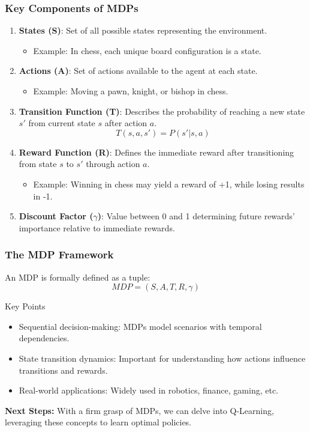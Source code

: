 \documentclass[aspectratio=169]{beamer}
\begin{document}
\begin{frame}[fragile]
    \frametitle{Key Components of MDPs}
    \begin{enumerate}
        \item \textbf{States (S)}: Set of all possible states representing the environment.
            \begin{itemize}
                \item Example: In chess, each unique board configuration is a state.
            \end{itemize}
        \item \textbf{Actions (A)}: Set of actions available to the agent at each state.
            \begin{itemize}
                \item Example: Moving a pawn, knight, or bishop in chess.
            \end{itemize}
        \item \textbf{Transition Function (T)}: Describes the probability of reaching a new state $s'$ from current state $s$ after action $a$.
            \begin{equation}
            T(s, a, s') = P(s' | s, a)
            \end{equation}
        \item \textbf{Reward Function (R)}: Defines the immediate reward after transitioning from state $s$ to $s'$ through action $a$.
            \begin{itemize}
                \item Example: Winning in chess may yield a reward of +1, while losing results in -1.
            \end{itemize}
        \item \textbf{Discount Factor ($\gamma$)}: Value between 0 and 1 determining future rewards' importance relative to immediate rewards.
    \end{enumerate}
\end{frame}

\begin{frame}[fragile]
    \frametitle{The MDP Framework}
    An MDP is formally defined as a tuple:
    \begin{equation}
    MDP = (S, A, T, R, \gamma)
    \end{equation}
    \begin{block}{Key Points}
        \begin{itemize}
            \item Sequential decision-making: MDPs model scenarios with temporal dependencies.
            \item State transition dynamics: Important for understanding how actions influence transitions and rewards.
            \item Real-world applications: Widely used in robotics, finance, gaming, etc.
        \end{itemize}
    \end{block}
    
    \textbf{Next Steps:} 
    With a firm grasp of MDPs, we can delve into Q-Learning, leveraging these concepts to learn optimal policies.
\end{frame}
\end{document}
